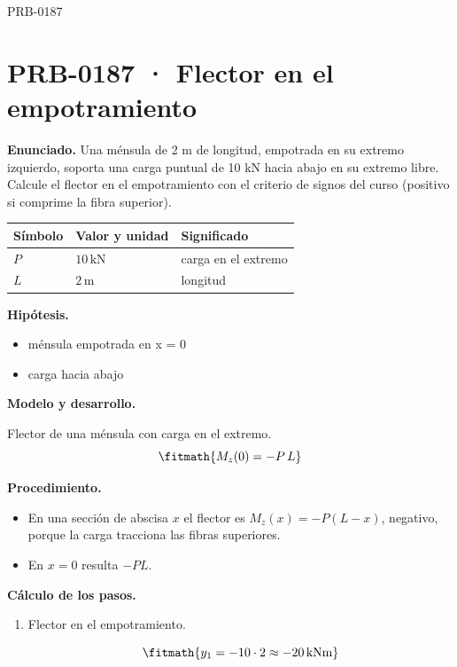 \begin{studiumworked}{PRB-0187}

\section{PRB-0187 · Flector en el empotramiento}

\textbf{Enunciado.} Una ménsula de 2 m de longitud, empotrada en su extremo izquierdo, soporta una carga puntual de 10 kN hacia abajo en su extremo libre. Calcule el flector en el empotramiento con el criterio de signos del curso (positivo si comprime la fibra superior).

\par\medskip\noindent\begin{tabular}{@{}p{.18\linewidth}p{.26\linewidth}p{.48\linewidth}@{}}
\toprule Símbolo & Valor y unidad & Significado\\\midrule
$P$ & $10\,\mathrm{kN}$ & carga en el extremo\\
$L$ & $2\,\mathrm{m}$ & longitud\\
\bottomrule\end{tabular}\par\medskip

\textbf{Hipótesis.}\begin{itemize}\item ménsula empotrada en x = 0
\item carga hacia abajo\end{itemize}

\textbf{Modelo y desarrollo.}

Flector de una ménsula con carga en el extremo.\[\fitmath{M_z(0) = -P\,L}\]

\textbf{Procedimiento.}\begin{itemize}\item En una sección de abscisa $x$ el flector es $M_z(x) = -P(L - x)$, negativo, porque la carga tracciona las fibras superiores.
\item En $x = 0$ resulta $-PL$.\end{itemize}

\textbf{Cálculo de los pasos.}

\begin{enumerate}

\item Flector en el empotramiento.

\[\fitmath{y_{1}=-10\cdot 2\approx -20\,\mathrm{kN m}}\]

\end{enumerate}


\end{studiumworked}
